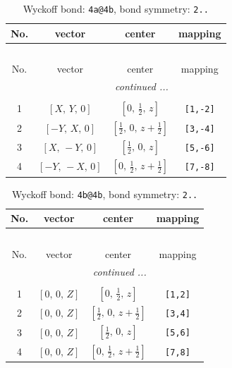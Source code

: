 \documentclass[fleqn,8pt]{jsarticle}
\begin{document}
\begin{longtable}{cccc}
\caption{Wyckoff bond: {\tt 4a@4b}, bond symmetry: {\tt 2..}}
 \\
 \hline \hline
No. & vector & center & mapping \\ \hline \endfirsthead

\multicolumn{3}{l}{\tablename\ \thetable{}} \\
 \hline \hline
No. & vector & center & mapping \\ \hline \endhead

 \hline \hline
\multicolumn{3}{r}{\footnotesize\it continued ...} \\ \endfoot

 \hline \hline
\multicolumn{3}{r}{} \\ \endlastfoot

1 & $\left[ X,\, Y,\, 0 \right]$ & $\left[ 0,\, \frac{1}{2},\, z \right]$ & {\tt [1,-2]} \\ \hline
2 & $\left[ - Y,\, X,\, 0 \right]$ & $\left[ \frac{1}{2},\, 0,\, z + \frac{1}{2} \right]$ & {\tt [3,-4]} \\ \hline
3 & $\left[ X,\, - Y,\, 0 \right]$ & $\left[ \frac{1}{2},\, 0,\, z \right]$ & {\tt [5,-6]} \\ \hline
4 & $\left[ - Y,\, - X,\, 0 \right]$ & $\left[ 0,\, \frac{1}{2},\, z + \frac{1}{2} \right]$ & {\tt [7,-8]} \\
\end{longtable}
\renewcommand{\arraystretch}{1.2}
\begin{longtable}{cccc}
\caption{Wyckoff bond: {\tt 4b@4b}, bond symmetry: {\tt 2..}}
 \\
 \hline \hline
No. & vector & center & mapping \\ \hline \endfirsthead

\multicolumn{3}{l}{\tablename\ \thetable{}} \\
 \hline \hline
No. & vector & center & mapping \\ \hline \endhead

 \hline \hline
\multicolumn{3}{r}{\footnotesize\it continued ...} \\ \endfoot

 \hline \hline
\multicolumn{3}{r}{} \\ \endlastfoot

1 & $\left[ 0,\, 0,\, Z \right]$ & $\left[ 0,\, \frac{1}{2},\, z \right]$ & {\tt [1,2]} \\ \hline
2 & $\left[ 0,\, 0,\, Z \right]$ & $\left[ \frac{1}{2},\, 0,\, z + \frac{1}{2} \right]$ & {\tt [3,4]} \\ \hline
3 & $\left[ 0,\, 0,\, Z \right]$ & $\left[ \frac{1}{2},\, 0,\, z \right]$ & {\tt [5,6]} \\ \hline
4 & $\left[ 0,\, 0,\, Z \right]$ & $\left[ 0,\, \frac{1}{2},\, z + \frac{1}{2} \right]$ & {\tt [7,8]} \\
\end{longtable}
\end{document}

